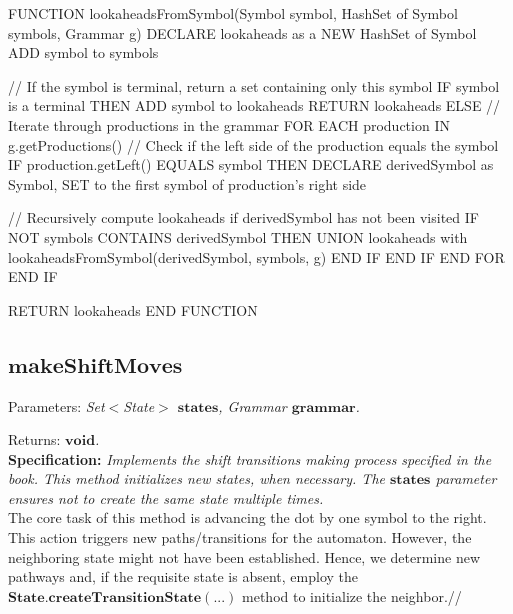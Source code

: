 \begin{codeblock}
    FUNCTION lookaheadsFromSymbol(Symbol symbol, HashSet of Symbol symbols, Grammar g)
    DECLARE lookaheads as a NEW HashSet of Symbol
    ADD symbol to symbols

    // If the symbol is terminal, return a set containing only this symbol
    IF symbol is a terminal THEN
    ADD symbol to lookaheads
    RETURN lookaheads
    ELSE
    // Iterate through productions in the grammar
    FOR EACH production IN g.getProductions()
    // Check if the left side of the production equals the symbol
    IF production.getLeft() EQUALS symbol THEN
    DECLARE derivedSymbol as Symbol, SET to the first symbol of production's right side

    // Recursively compute lookaheads if derivedSymbol has not been visited
    IF NOT symbols CONTAINS derivedSymbol THEN
    UNION lookaheads with lookaheadsFromSymbol(derivedSymbol, symbols, g)
    END IF
    END IF
    END FOR
    END IF

    RETURN lookaheads
    END FUNCTION

\end{codeblock}

\vspace{30pt}

\subsection{\(\boldsymbol{makeShiftMoves}\)}

Parameters: \textit{Set\(<\)State\(>\) \(\boldsymbol{states}\), Grammar \(\boldsymbol{grammar}\).}

Returns: \textit{\(\boldsymbol{void}\).}\\

\textbf{Specification:} \textit{Implements the shift transitions making process specified in the book. This method initializes new states, when necessary. The \(\boldsymbol{states}\) parameter ensures not to create the same state multiple times.}\\

The core task of this method is advancing the dot by one symbol to the right. This action triggers new paths/transitions for the automaton. However, the neighboring state might not have been established. Hence, we determine new pathways and, if the requisite state is absent, employ the \(\boldsymbol{State.createTransitionState(...)}\) method to initialize the neighbor.//

